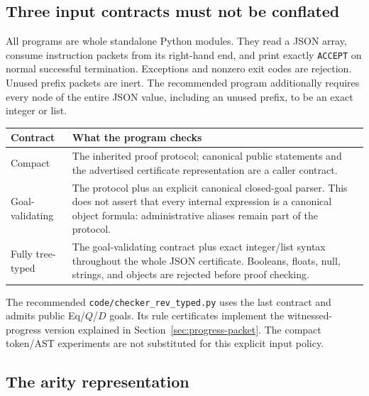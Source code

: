\documentclass[11pt,letterpaper]{article}
\theoremstyle{definition}\newtheorem{definition}[theorem]{Definition}
\theoremstyle{remark}\newtheorem{remark}[theorem]{Remark}
\newcommand{\code}[1]{{\small\nolinkurl{#1}}}
\begin{document}
\subsection{Three input contracts must not be conflated}

All programs are whole standalone Python modules. They read a JSON
array, consume instruction packets from its right-hand end, and print
exactly \code{ACCEPT} on normal successful termination. Exceptions and
nonzero exit codes are rejection. Unused prefix packets are inert.
The recommended program additionally requires every node of the entire
JSON value, including an unused prefix, to be an exact integer or list.

\begin{center}\small
\begin{tabularx}{\linewidth}{@{}lX@{}}
\toprule
Contract & What the program checks\\
\midrule
Compact & The inherited proof protocol; canonical public statements and
the advertised certificate representation are a caller contract.\\
Goal-validating & The protocol plus an explicit canonical closed-goal
parser. This does not assert that every internal expression is a canonical
object formula: administrative aliases remain part of the protocol.\\
Fully tree-typed & The goal-validating contract plus exact integer/list
syntax throughout the whole JSON certificate. Booleans, floats, null,
strings, and objects are rejected before proof checking.\\
\bottomrule
\end{tabularx}
\end{center}

The recommended \code{code/checker_rev_typed.py} uses the last contract
and admits public Eq/$Q$/$D$ goals. Its rule certificates implement the
witnessed-progress version explained in Section~\ref{sec:progress-packet}.
The compact token/AST experiments are not substituted for this explicit
input policy.

\subsection{The arity representation}
\end{document}
